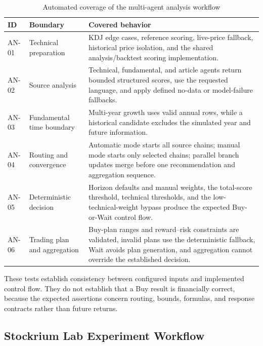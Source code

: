 \begin{table}[H]
    \centering
    \caption{Automated coverage of the multi-agent analysis workflow}
    \label{tab:analysis-automated-coverage}
    \footnotesize
    \begin{tabularx}{\textwidth}{>{\raggedright\arraybackslash}p{1.35cm} >{\raggedright\arraybackslash}p{3.0cm} X}
        \toprule
        \textbf{ID} & \textbf{Boundary} & \textbf{Covered behavior} \\
        \midrule
        AN-01 & Technical preparation & KDJ edge cases, reference scoring, live-price fallback, historical price isolation, and the shared analysis/backtest scoring implementation. \\
        \addlinespace
        AN-02 & Source analysis & Technical, fundamental, and article agents return bounded structured scores, use the requested language, and apply defined no-data or model-failure fallbacks. \\
        \addlinespace
        AN-03 & Fundamental time boundary & Multi-year growth uses valid annual rows, while a historical candidate excludes the simulated year and future information. \\
        \addlinespace
        AN-04 & Routing and convergence & Automatic mode starts all source chains; manual mode starts only selected chains; parallel branch updates merge before one recommendation and aggregation sequence. \\
        \addlinespace
        AN-05 & Deterministic decision & Horizon defaults and manual weights, the total-score threshold, technical thresholds, and the low-technical-weight bypass produce the expected Buy-or-Wait control flow. \\
        \addlinespace
        AN-06 & Trading plan and aggregation & Buy-plan ranges and reward--risk constraints are validated, invalid plans use the deterministic fallback, Wait avoids plan generation, and aggregation cannot override the established decision. \\
        \bottomrule
    \end{tabularx}
\end{table}

These tests establish consistency between configured inputs and implemented control flow. They do not establish that a Buy result is financially correct, because the expected assertions concern routing, bounds, formulas, and response contracts rather than future returns.

\subsection{Stockrium Lab Experiment Workflow}
\label{subsec:stockrium-lab-experiment-testing}

